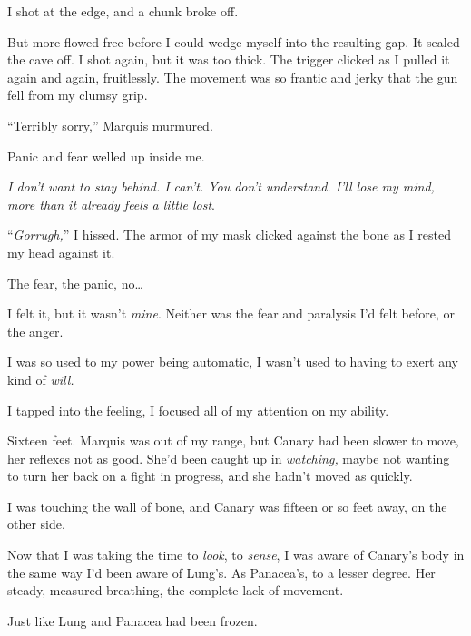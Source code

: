 I shot at the edge, and a chunk broke off.



But more flowed free before I could wedge myself into the resulting gap.  It sealed the cave off.  I shot again, but it was too thick.  The trigger clicked as I pulled it again and again, fruitlessly.  The movement was so frantic and jerky that the gun fell from my clumsy grip.



``Terribly sorry,'' Marquis murmured.



Panic and fear welled up inside me.



\emph{I don't want to stay behind.  I can't.  You don't understand.  I'll lose my mind, more than it already feels a little lost}.



``\emph{Gorrugh,}'' I hissed.  The armor of my mask clicked against the bone as I rested my head against it.



The fear, the panic, no\ldots



I felt it, but it wasn't \emph{mine}.  Neither was the fear and paralysis I'd felt before, or the anger.



I was so used to my power being automatic, I wasn't used to having to exert any kind of \emph{will.}



I tapped into the feeling, I focused all of my attention on my ability.



Sixteen feet.  Marquis was out of my range, but Canary had been slower to move, her reflexes not as good.  She'd been caught up in \emph{watching, }maybe not wanting to turn her back on a fight in progress, and she hadn't moved as quickly.



I was touching the wall of bone, and Canary was fifteen or so feet away, on the other side.



Now that I was taking the time to \emph{look}, to \emph{sense}, I was aware of Canary's body in the same way I'd been aware of Lung's.  As Panacea's, to a lesser degree.  Her steady, measured breathing, the complete lack of movement.



Just like Lung and Panacea had been frozen.



